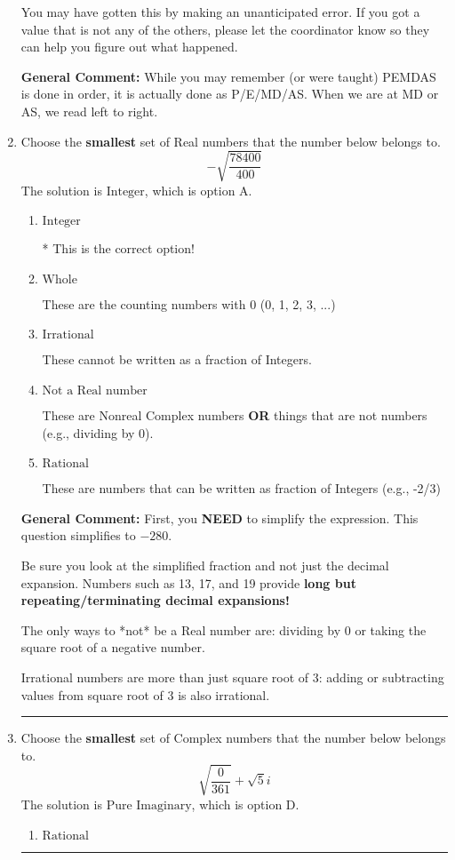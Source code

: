 \documentclass{extbook}[14pt]
\newcommand{\litem}[1]{\item #1

\rule{\textwidth}{0.4pt}}
\begin{document}
\begin{enumerate}
{\begin{enumerate}[label=\Alph*.]
 You may have gotten this by making an unanticipated error. If you got a value that is not any of the others, please let the coordinator know so they can help you figure out what happened.
\end{enumerate}

\textbf{General Comment:} While you may remember (or were taught) PEMDAS is done in order, it is actually done as P/E/MD/AS. When we are at MD or AS, we read left to right.
}
\litem{
Choose the \textbf{smallest} set of Real numbers that the number below belongs to.
\[ -\sqrt{\frac{78400}{400}} \]The solution is \( \text{Integer} \), which is option A.\begin{enumerate}[label=\Alph*.]
\item \( \text{Integer} \)

* This is the correct option!
\item \( \text{Whole} \)

These are the counting numbers with 0 (0, 1, 2, 3, ...)
\item \( \text{Irrational} \)

These cannot be written as a fraction of Integers.
\item \( \text{Not a Real number} \)

These are Nonreal Complex numbers \textbf{OR} things that are not numbers (e.g., dividing by 0).
\item \( \text{Rational} \)

These are numbers that can be written as fraction of Integers (e.g., -2/3)
\end{enumerate}

\textbf{General Comment:} First, you \textbf{NEED} to simplify the expression. This question simplifies to $-280$. 
 
 Be sure you look at the simplified fraction and not just the decimal expansion. Numbers such as 13, 17, and 19 provide \textbf{long but repeating/terminating decimal expansions!} 
 
 The only ways to *not* be a Real number are: dividing by 0 or taking the square root of a negative number. 
 
 Irrational numbers are more than just square root of 3: adding or subtracting values from square root of 3 is also irrational.
}
\litem{
Choose the \textbf{smallest} set of Complex numbers that the number below belongs to.
\[ \sqrt{\frac{0}{361}}+\sqrt{5}i \]The solution is \( \text{Pure Imaginary} \), which is option D.\begin{enumerate}[label=\Alph*.]
\item \( \text{Rational} \)


\end{enumerate}}
\end{enumerate}
\end{document}
